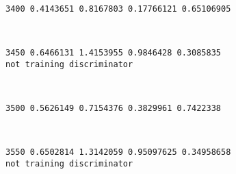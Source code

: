 \documentclass[11pt]{article}
\begin{document}
    \begin{Verbatim}[commandchars=\\\{\}]
3400 0.4143651 0.8167803 0.17766121 0.65106905

    \end{Verbatim}

    \begin{center}
    \end{center}
    { \hspace*{\fill} \\}
    
    \begin{Verbatim}[commandchars=\\\{\}]
3450 0.6466131 1.4153955 0.9846428 0.3085835
not training discriminator

    \end{Verbatim}

    \begin{center}
    \end{center}
    { \hspace*{\fill} \\}
    
    \begin{Verbatim}[commandchars=\\\{\}]
3500 0.5626149 0.7154376 0.3829961 0.7422338

    \end{Verbatim}

    \begin{center}
    \end{center}
    { \hspace*{\fill} \\}
    
    \begin{Verbatim}[commandchars=\\\{\}]
3550 0.6502814 1.3142059 0.95097625 0.34958658
not training discriminator

    \end{Verbatim}

    \begin{center}
    \end{center}
    { \hspace*{\fill} \\}
    
\end{document}
